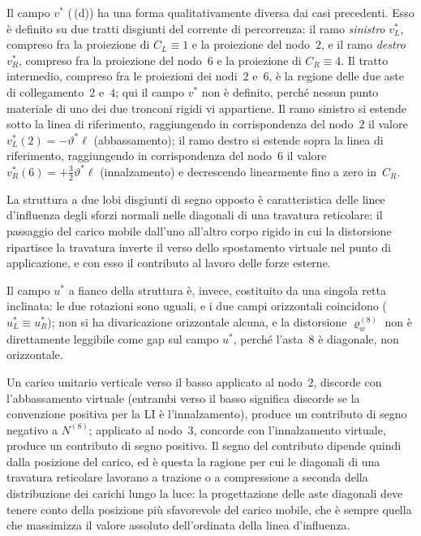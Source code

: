 \begin{esempio}
\begin{svolgimento}
		Il campo $v^*$ (\,(d)) ha una forma
		qualitativamente diversa dai casi precedenti. Esso è definito su
		due tratti disgiunti del corrente di percorrenza: il ramo
		\emph{sinistro} $v^*_L$, compreso fra la proiezione di $C_L\equiv 1$
		e la proiezione del nodo~$2$, e il ramo \emph{destro} $v^*_R$,
		compreso fra la proiezione del nodo~$6$ e la proiezione di
		$C_R\equiv 4$. Il tratto intermedio, compreso fra le proiezioni
		dei nodi~$2$ e~$6$, è la regione delle due aste di collegamento~$2$
		e~$4$; qui il campo $v^*$ non è definito, perché nessun punto
		materiale di uno dei due tronconi rigidi vi appartiene. Il ramo
		sinistro si estende sotto la linea di riferimento, raggiungendo in
		corrispondenza del nodo~$2$ il valore $v^*_L(2)=-\vartheta^*\ell$
		(abbassamento); il ramo destro si estende sopra la linea di
		riferimento, raggiungendo in corrispondenza del nodo~$6$ il valore
		$v^*_R(6)=+\tfrac{3}{2}\vartheta^*\ell$ (innalzamento) e decrescendo
		linearmente fino a zero in~$C_R$.
		
		La struttura a due lobi disgiunti di segno opposto è caratteristica
		delle linee d'influenza degli sforzi normali nelle diagonali di
		una travatura reticolare: il passaggio del carico mobile dall'uno
		all'altro corpo rigido in cui la distorsione ripartisce la
		travatura inverte il verso dello spostamento virtuale nel punto di
		applicazione, e con esso il contributo al lavoro delle forze
		esterne.
		
		Il campo $u^*$ a fianco della struttura è, invece, costituito da
		una singola retta inclinata: le due rotazioni sono uguali, e i due
		campi orizzontali coincidono ($u^*_L\equiv u^*_R$); non si ha
		divaricazione orizzontale alcuna, e la distorsione $\varrho_w^{(8)}$
		non è direttamente leggibile come gap sul campo $u^*$, perché
		l'asta~$8$ è diagonale, non orizzontale.
		
		Un carico unitario verticale verso il basso applicato al nodo~$2$,
		discorde con l'abbassamento virtuale (entrambi verso il basso
		significa discorde se la convenzione positiva per la LI è
		l'innalzamento), produce un contributo di segno negativo a
		$N^{(8)}$; applicato al nodo~$3$, concorde con l'innalzamento
		virtuale, produce un contributo di segno positivo. Il segno del
		contributo dipende quindi dalla posizione del carico, ed è questa
		la ragione per cui le diagonali di una travatura reticolare
		lavorano a trazione o a compressione a seconda della distribuzione
		dei carichi lungo la luce: la progettazione delle aste diagonali
		deve tenere conto della posizione più sfavorevole del carico
		mobile, che è sempre quella che massimizza il valore assoluto
		dell'ordinata della linea d'influenza.
	\end{svolgimento}
\end{esempio}

